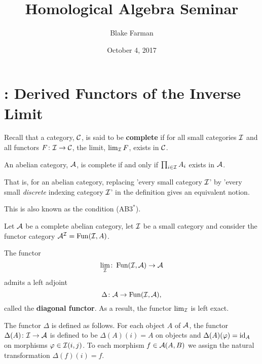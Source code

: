 \documentclass[reqno, 12pt]{amsart}
\title[Seminar]{Homological Algebra Seminar}
\author{Blake Farman}
\date{October 4, 2017}
\begin{document}
\maketitle

\section{\cite[Section 3.5]{Weibel95}: Derived Functors of the Inverse Limit}

Recall that a category, $\mathcal{C}$, is said to be \textbf{complete} if for all small categories $\mathcal{I}$ and all functors $F \colon \mathcal{I} \to \mathcal{C}$, the limit, $\lim_{\mathcal{I}} F$, exists in $\mathcal{C}$.
\begin{exercise}
  An abelian category, $\mathcal{A}$, is complete if and only if
  $\prod_{i \in \mathcal{I}} A_i$
  exists in $\mathcal{A}$.

  That is, for an abelian category, replacing 'every small category $\mathcal{I}$' by 'every small \textit{discrete} indexing category $\mathcal{I}$' in the definition gives an equivalent notion.
\end{exercise}

\begin{remark}
  This is also known as the condition (AB$3^\ast$).
\end{remark}

Let $\mathcal{A}$ be a complete abelian category, let $\mathcal{I}$ be a small category and consider the functor category $\mathcal{A}^{\mathcal{I}} = \operatorname{Fun}(\mathcal{I},A)$.

\begin{proposition}
  The functor
  $$\lim_{\mathcal{I}} \colon \operatorname{Fun}(\mathcal{I}, \mathcal{A}) \to \mathcal{A}$$
  admits a left adjoint
  $$\Delta \colon \mathcal{A} \to \operatorname{Fun}(\mathcal{I}, \mathcal{A}),$$
  called the \textbf{diagonal functor}.
  As a result, the functor $\lim_{\mathcal{I}}$ is left exact.
  
  The functor $\Delta$ is defined as follows.
  For each object $A$ of $\mathcal{A}$, the functor $\Delta(A) \colon \mathcal{I} \to \mathcal{A}$ is defined to be $\Delta(A)(i) = A$ on objects and $\Delta(A)(\varphi) = \operatorname{id}_A$ on morphisms $\varphi \in \mathcal{I}(i,j)$.
  To each morphism $f \in \mathcal{A}(A,B)$ we assign the natural transformation $\Delta(f)(i) = f$.
\end{proposition}
\end{document}

